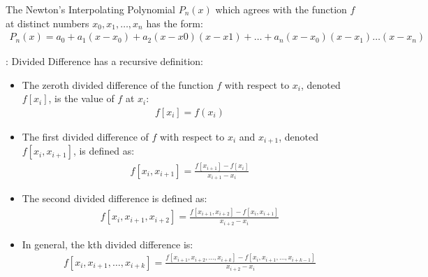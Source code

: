     \par The Newton's Interpolating Polynomial $P_n(x)$ which agrees with the
      function $f$ at distinct numbers $x_0, x_1, \ldots, x_n$ has the form:
      \begin{align*}
        P_n(x) = a_0 + a_1(x - x_0) + a_2(x - x0)(x - x1) + \ldots
              + a_n(x - x_0)(x - x_1) \ldots (x - x_n)
      \end{align*}
    \par {}: Divided Difference has a recursive definition:
      \begin{itemize}
        \item The zeroth divided difference of the function $f$ with respect
          to $x_i$, denoted $f[x_i]$, is the value of $f$ at $x_i$:
          \begin{align*}
            f[x_i] = f(x_i)
          \end{align*}
        \item The first divided difference of $f$ with respect to $x_i$ and
          $x_{i + 1}$, denoted $f[x_i, x_{i + 1}]$, is defined as:
          \begin{align*}
            f[x_i, x_{i + 1}] = \frac{f[x_{i + 1}] - f[x_i]}{x_{i + 1} - x_i}
          \end{align*}
        \item The second divided difference is defined as:
          \begin{align*}
            f[x_i, x_{i + 1}, x_{i + 2}]
              = \frac{f[x_{i + 1}, x_{i + 2}] - f[x_i, x_{i + 1}]}{x_{i + 2} - x_i}
          \end{align*}
        \item In general, the kth divided difference is:
          \begin{align*}
            f[x_i, x_{i + 1}, \ldots, x_{i + k}]
              = \frac{f[x_{i + 1}, x_{i + 2}, \ldots, x_{i + k}]
                    - f[x_i, x_{i + 1}, \ldots, x_{i + k - 1}]}
                     {x_{i + 2} - x_i}
          \end{align*}
      \end{itemize}

